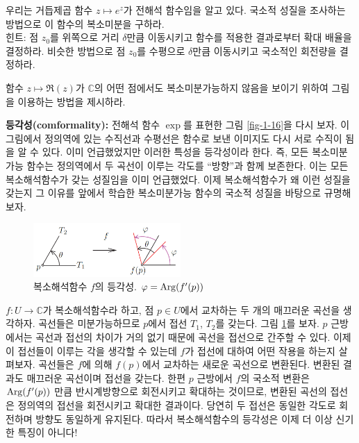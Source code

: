 \begin{salt_exercise}\label{ex-2-17}
우리는 거듭제곱 함수 $z\mapsto e^z$가 전해석 함수임을 알고 있다.
국소적 성질을 조사하는 방법으로 이 함수의 복소미분을 구하라. \\[1ex]
힌트:  점 $z_0$를 위쪽으로 거리 $\delta$만큼 이동시키고
함수를 적용한 결과로부터 확대 배율을 결정하라.
비슷한 방법으로 
점 $z_0$를 수평으로 $\delta$만큼 이동시키고
국소적인 회전량을 결정하라.
\end{salt_exercise}

\begin{salt_exercise}\label{ex-2-18}
함수 $z\mapsto \Re(z)$가 
$\mathbb C$의 어떤 점에서도 복소미분가능하지 않음을 보이기 위하여
그림을 이용하는 방법을 제시하라.
\end{salt_exercise}

{\bf 등각성(comformality):}
전해석 함수 $\exp$를 표현한 그림 \ref{fig-1-16}을 다시 보자.
이 그림에서 정의역에 있는 수직선과 수평선은 함수로 보낸 이미지도
다시 서로 수직이 됨을 알 수 있다.
이미 언급했었지만 이러한 특성을 등각성이라 한다.
즉, 모든 복소미분가능 함수는 정의역에서 두 곡선이 이루는 각도를 ``방향''과 함께 
보존한다. 이는 모든 복소해석함수가 갖는 성질임을 이미 언급했었다.
이제 복소해석함수가 왜 이런 성질을 갖는지 그 이유를
앞에서 학습한 복소미분가능 함수의 국소적 성질을 바탕으로 규명해보자.

\begin{figure}[!h]
\begin{center}
\includegraphics[width=0.5\textwidth]{./SaltChapter/figs/fig-2-14}
\end{center}
\caption{복소해석함수 $f$의 등각성.  $\varphi = \mathop{\mathrm{Arg}}(f'(p))$}
\label{fig-2-14}
\end{figure}

$f: U\to \mathbb C$가 복소해석함수라 하고,
점 $p\in U$에서 교차하는 두 개의 매끄러운 곡선을 생각하자.
곡선들은 미분가능하므로 $p$에서 접선 $T_1$, $T_2$를 갖는다.
그림 \ref{fig-2-14}를 보자. 
$p$ 근방에서는 곡선과 접선의 차이가 거의 없기 때문에
곡선을 접선으로 간주할 수 있다.
이제 이 접선들이 이루는 각을 생각할 수 있는데  $f$가 접선에 대하여 어떤 작용을 하는지 살펴보자.
곡선들은 $f$에 의해 $f(p)$에서 교차하는 새로운 곡선으로 변환된다.
변환된 결과도 매끄러운 곡선이며 접선을 갖는다.
한편 $p$ 근방에서 $f$의 국소적 변환은 $\mathop{\mathrm{Arg}}(f'(p))$ 만큼 반시계방향으로 회전시키고
확대하는 것이므로, 변환된 곡선의 접선은
정의역의 접선을 회전시키고 확대한 결과이다.
당연히 두 접선은 동일한 각도로 회전하며 방향도 동일하게 유지된다.
따라서 복소해석함수의 등각성은 이제 더 이상 신기한 특징이 아니다!

